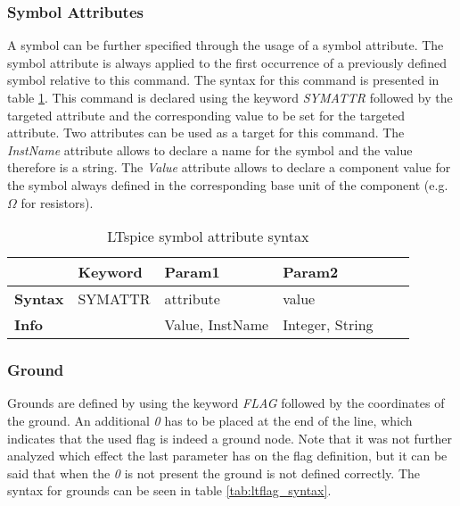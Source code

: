\subsubsection{Symbol Attributes}

A symbol can be further specified through the usage of a symbol attribute.
The symbol attribute is always applied to the first occurrence of a previously defined symbol relative to this command.
The syntax for this command is presented in table \ref{tab:ltsymattr_syntax}.
This command is declared using the keyword \textit{SYMATTR} followed by the targeted attribute and the corresponding value to be set for the targeted attribute.
Two attributes can be used as a target for this command.
The \textit{InstName} attribute allows to declare a name for the symbol and the value therefore is a string.
The \textit{Value} attribute allows to declare a component value for the symbol always defined in the corresponding base unit of the component (e.g. $\Omega$ for resistors).

\begin{table}[H]
\begin{center}

\begin{tabular}{l|l|l|l|l|l}
    & \textbf{Keyword} & \textbf{Param1} & \textbf{Param2}\\
    \hline
    \textbf{Syntax} & SYMATTR & attribute & value\\
    \textbf{Info} & & Value, InstName & Integer, String\\
\end{tabular}
\caption{LTspice symbol attribute syntax}
\label{tab:ltsymattr_syntax}

\end{center}
\end{table}

\subsubsection{Ground}

Grounds are defined by using the keyword \textit{FLAG} followed by the coordinates of the ground.
An additional \textit{0} has to be placed at the end of the line, which indicates that the used flag is indeed a ground node.
Note that it was not further analyzed which effect the last parameter has on the flag definition, but it can be said that when the \textit{0} is not present the ground is not defined correctly.
The syntax for grounds can be seen in table \ref{tab:ltflag_syntax}.

